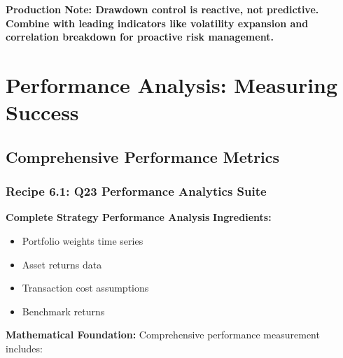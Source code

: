 \documentclass[11pt,letterpaper,openany]{book}
\begin{document}
\textbf{Production Note: Drawdown control is reactive, not predictive. Combine with leading indicators like volatility expansion and correlation breakdown for proactive risk management.}

\chapter{Performance Analysis: Measuring Success}

\section{Comprehensive Performance Metrics}

\subsection{Recipe 6.1: Q23 Performance Analytics Suite}

\textbf{Complete Strategy Performance Analysis}
\textbf{Ingredients:}
\begin{itemize}
    \item Portfolio weights time series
    \item Asset returns data
    \item Transaction cost assumptions
    \item Benchmark returns
\end{itemize}
\textbf{Mathematical Foundation:}
Comprehensive performance measurement includes:
\end{document}

